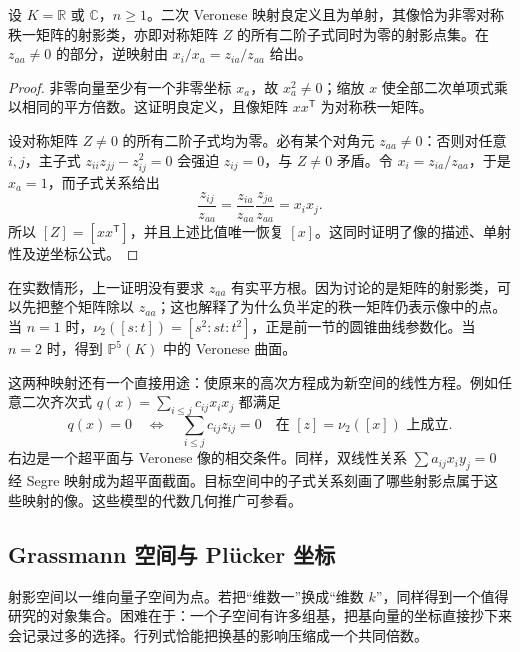 \begin{proposition}\label{g1:prop:veronese-image}
	设 \(K=\mathbb R\) 或 \(\mathbb C\)，\(n\ge1\)。二次 Veronese 映射良定义且为单射，其像恰为非零对称秩一矩阵的射影类，亦即对称矩阵 \(Z\) 的所有二阶子式同时为零的射影点集。在 \(z_{aa}\ne0\) 的部分，逆映射由 \(x_i/x_a=z_{ia}/z_{aa}\) 给出。
\end{proposition}
\begin{proof}
	非零向量至少有一个非零坐标 \(x_a\)，故 \(x_a^2\ne0\)；缩放 \(x\) 使全部二次单项式乘以相同的平方倍数。这证明良定义，且像矩阵 \(xx^{\mathsf T}\) 为对称秩一矩阵。

	设对称矩阵 \(Z\ne0\) 的所有二阶子式均为零。必有某个对角元 \(z_{aa}\ne0\)：否则对任意 \(i,j\)，主子式 \(z_{ii}z_{jj}-z_{ij}^2=0\) 会强迫 \(z_{ij}=0\)，与 \(Z\ne0\) 矛盾。令 \(x_i=z_{ia}/z_{aa}\)，于是 \(x_a=1\)，而子式关系给出
	\[
		\frac{z_{ij}}{z_{aa}}
		=\frac{z_{ia}}{z_{aa}}\frac{z_{ja}}{z_{aa}}=x_i x_j.
	\]
	所以 \([Z]=[xx^{\mathsf T}]\)，并且上述比值唯一恢复 \([x]\)。这同时证明了像的描述、单射性及逆坐标公式。
\end{proof}

在实数情形，上一证明没有要求 \(z_{aa}\) 有实平方根。因为讨论的是矩阵的射影类，可以先把整个矩阵除以 \(z_{aa}\)；这也解释了为什么负半定的秩一矩阵仍表示像中的点。当 \(n=1\) 时，\(\nu_2([s:t])=[s^2:st:t^2]\)，正是前一节的圆锥曲线参数化。当 \(n=2\) 时，得到 \(\mathbb P^5(K)\) 中的 Veronese 曲面。

\ProseParagraphBreak

这两种映射还有一个直接用途：使原来的高次方程成为新空间的线性方程。例如任意二次齐次式 \(q(x)=\sum_{i\le j}c_{ij}x_i x_j\) 都满足
\[
	q(x)=0\quad\Longleftrightarrow\quad
	\sum_{i\le j}c_{ij}z_{ij}=0\quad\text{在 }[z]=\nu_2([x])\text{ 上成立}.
\]
右边是一个超平面与 Veronese 像的相交条件。同样，双线性关系 \(\sum a_{ij}x_i y_j=0\) 经 Segre 映射成为超平面截面。目标空间中的子式关系刻画了哪些射影点属于这些映射的像。这些模型的代数几何推广可参看\cite[第I章, 第2, Exercises节 2.12--2.15]{Hartshorne1977}。

\subsection{Grassmann 空间与 Plücker 坐标}
\label{g1:subsec:0206:02}

射影空间以一维向量子空间为点。若把“维数一”换成“维数 \(k\)”，同样得到一个值得研究的对象集合。困难在于：一个子空间有许多组基，把基向量的坐标直接抄下来会记录过多的选择。行列式恰能把换基的影响压缩成一个共同倍数。

